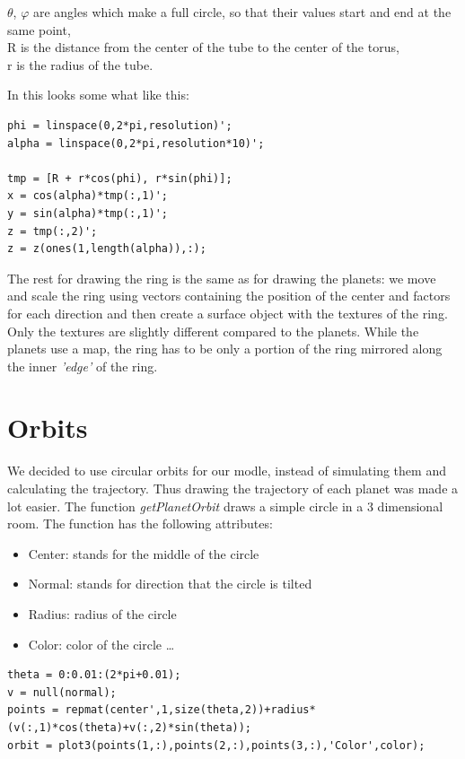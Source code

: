 $\theta$, $\varphi$ are angles which make a full circle, so that their values start and end at the same point,\\
R is the distance from the center of the tube to the center of the torus,\\
r is the radius of the tube.

In \matlab{} this looks some what like this:
\begin{framed}\begin{verbatim}
phi = linspace(0,2*pi,resolution)';
alpha = linspace(0,2*pi,resolution*10)';

tmp = [R + r*cos(phi), r*sin(phi)];
x = cos(alpha)*tmp(:,1)';
y = sin(alpha)*tmp(:,1)';
z = tmp(:,2)';
z = z(ones(1,length(alpha)),:);
\end{verbatim}\end{framed}
The rest for drawing the ring is the same as for drawing the planets: we move and scale the ring using vectors containing the position of the center and factors for each direction and then create a surface object with the textures of the ring. Only the textures are slightly different compared to the planets. While the planets use a map, the ring has to be only a portion of the ring mirrored along the inner {\em 'edge'} of the ring.


\section{Orbits}
We decided to use circular orbits for our modle, instead of simulating them and calculating the trajectory. Thus drawing the trajectory of each planet was made a lot easier.  The function {\em getPlanetOrbit} draws a simple circle in a 3 dimensional room. The function has the following attributes:
\begin{itemize}
  \item Center: stands for the middle of the circle
  \item Normal: stands for direction that the circle is tilted
  \item Radius: radius of the circle
  \item Color: color of the circle \ldots
\end{itemize}


\begin{framed}\begin{verbatim}
theta = 0:0.01:(2*pi+0.01);
v = null(normal);
points = repmat(center',1,size(theta,2))+radius*(v(:,1)*cos(theta)+v(:,2)*sin(theta));
orbit = plot3(points(1,:),points(2,:),points(3,:),'Color',color);
\end{verbatim}\end{framed}

